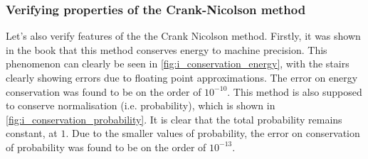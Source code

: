 \subsubsection{Verifying properties of the Crank-Nicolson method}
\label{sec:crank}

Let's also verify features of the the Crank Nicolson method. Firstly, it was shown in the book \cite{physnumbook} that this method conserves energy to machine precision. This phenomenon can clearly be seen in \autoref{fig:i_conservation_energy}, with the stairs clearly showing errors due to floating point approximations. The error on energy conservation was found to be on the order of \(10^{-10}\). This method is also supposed to conserve normalisation (i.e. probability), which is shown in \autoref{fig:i_conservation_probability}. It is clear that the total probability remains constant, at \(1\). Due to the smaller values of probability, the error on conservation of probability was found to be on the order of \(10^{-13}\).

